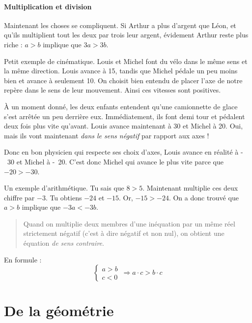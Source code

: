 \documentclass[a4paper,12pt]{book}
\theoremstyle{mes_exemples}	\newtheorem{exemple}[numtho]{Exemple}
\theoremstyle{mes_tho}
\begin{document}
\subsubsection{Multiplication et division}

Maintenant les choses se compliquent. Si Arthur a plus d'argent que Léon, et qu'ils multiplient tout les deux par trois leur argent, évidement Arthur reste plus riche : $a > b$ implique que $3a>3b$.

Petit exemple de cinématique. Louis et Michel font du vélo dans le même sens et la même direction. Louis avance à \unit{15}{\kilo\meter\per\hour}, tandis que Michel pédale un peu moins bien et avance à seulement \unit{10}{\kilo\meter\per\hour}. On choisit bien entendu de placer l'axe de notre repère dans le sens de leur mouvement. Ainsi ces vitesses sont positives.

À un moment donné, les deux enfants entendent qu'une camionnette de glace s'est arrêtée un peu derrière eux. Immédiatement, ils font demi tour et pédalent deux fois plus vite qu'avant. Louis avance maintenant à \unit{30}{\kilo\meter\per\hour} et Michel à \unit{20}{\kilo\meter\per\hour}. Oui, mais ils vont maintenant \emph{dans le sens négatif} par rapport aux axes !

Donc en bon physicien qui respecte ses choix d'axes, Louis avance en réalité à \unit{-30}{\kilo\meter\per\hour} et Michel à \unit{-20}{\kilo\meter\per\hour}. C'est donc Michel qui avance le plus vite parce que $-20 > -30$.


Un exemple d'arithmétique. Tu sais que $8 > 5$. Maintenant multiplie ces deux chiffre par $-3$. Tu obtiens $-24$ et $-15$. Or, $-15>-24$. On a donc trouvé que $a>b$ implique que $-3a<-3b$.

\begin{quote}
Quand on multiplie deux membres d'une inéquation par un même réel strictement négatif (c'est à dire négatif et non nul), on obtient une équation \emph{de sens contraire}.
\end{quote}
En formule :
\[
\left\{ 
\begin{matrix}
a>b\\
c<0
\end{matrix}
\right.\,
\Longrightarrow
 a\cdot c>b\cdot c
\]








\chapter{De la géométrie}
\end{document}
